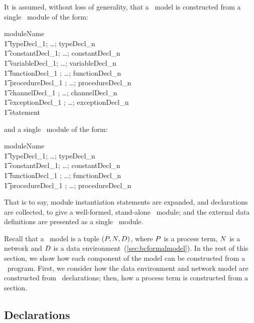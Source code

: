 It is assumed, without loss of generality, that
a \bcandle\ model is constructed from a single \candle\ 
module of the form:
\begin{zed}
 moduleName  \\
\t1  typeDecl_1; \ldots ; typeDecl_n \\
\t1  constantDecl_1; \ldots ; constantDecl_n \\
\t1  variableDecl_1; \ldots ; variableDecl_n \\
\t1  functionDecl_1 ; \ldots ; functionDecl_n \\
\t1  procedureDecl_1 ; \ldots ; procedureDecl_n \\
\t1 \trm{channel } channelDecl_1 ; \ldots ; channelDecl_n \\
\t1  exceptionDecl_1 ; \ldots ; exceptionDecl_n \\
\t1 \trm{behaviour } statement \\
\end{zed}
and a single \sdml\ module of the form:
\begin{zed}
 moduleName  \\
\t1  typeDecl_1; \ldots ; typeDecl_n \\
\t1  constantDecl_1; \ldots ; constantDecl_n \\
\t1  functionDecl_1 ; \ldots ; functionDecl_n \\
\t1  procedureDecl_1 ; \ldots ; procedureDecl_n \\
\trm{end data}
\end{zed}
That is to say, module instantiation statements are expanded, and
declarations are collected, to give a well-formed, stand-alone
\candle\ module; and the external data definitions are presented as a
single \sdml\ module.

Recall that a \bcandle\ model is a tuple $(\P,\N,\D)$, where $\P$ is a
process term, $\N$ is a network and $\D$ is a data
environment~(\Sec\ref{sec:bcformalmodel}). In the rest of this
section, we show how each component of the model can be constructed
from a \candle\ program. First, we consider how the data environment 
and network model are constructed from \candle\ declarations;
then, how a process term is constructed from a  section.

\subsection{Declarations}\label{ss:prformaldecls}
